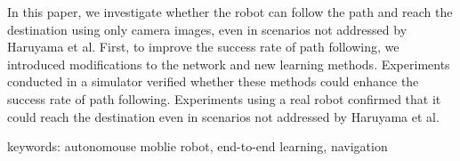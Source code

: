 In this paper, we investigate whether the robot can follow the path and reach the destination using only camera images, even in scenarios not addressed by Haruyama et al.
First, to improve the success rate of path following, we introduced modifications to the network and new learning methods.
Experiments conducted in a simulator verified whether these methods could enhance the success rate of path following.
Experiments using a real robot confirmed that it could reach the destination even in scenarios not addressed by Haruyama et al.

keywords: autonomouse moblie robot, end-to-end learning, navigation
